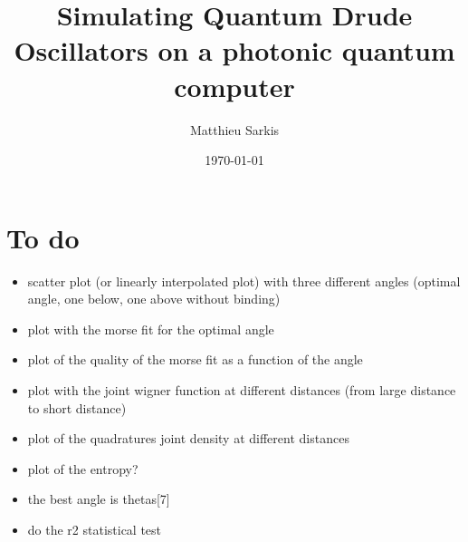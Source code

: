 \documentclass[reprint, amsmath, amssymb, aps]{revtex4-2}
\begin{document}
\preprint{}

\title{Simulating Quantum Drude Oscillators on a photonic quantum computer}

\author{Matthieu Sarkis}

\author{}
\email{}
\affiliation{
}


\date{\today}

\begin{abstract}
\end{abstract}

\maketitle


\section{To do}

\begin{itemize}
    \item scatter plot (or linearly interpolated plot) with three different angles (optimal angle, one below, one above without binding)
    \item plot with the morse fit for the optimal angle
    \item plot of the quality of the morse fit as a function of the angle
    \item plot with the joint wigner function at different distances (from large distance to short distance)
    \item plot of the quadratures joint density at different distances
    \item plot of the entropy?
    \item the best angle is thetas[7]
    \item do the r2 statistical test
\end{itemize}
\end{document}
